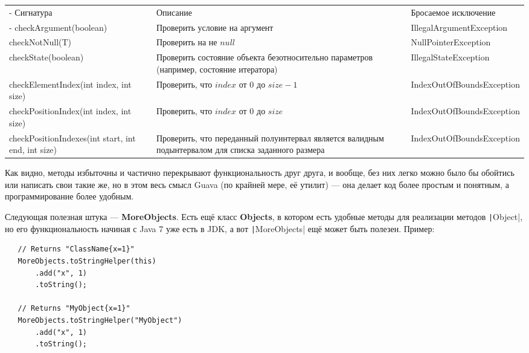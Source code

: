 \documentclass[a5paper,draft]{article}
\begin{document}
\begin{footnotesize}
\begin{tabu} {| X[0.9 l p] | X[1 l p] | X[1 l p] |}
	\tabucline-
	Сигнатура                                            & Описание                                                                                            & Бросаемое исключение      \\
	\tabucline-
	\everyrow{\tabucline-}
	checkArgument(boolean)                             & Проверить условие на аргумент                                                                       & IllegalArgumentException  \\
	checkNotNull(T)                                    & Проверить на не $null$                                                                              & NullPointerException      \\
	checkState(boolean)                                & Проверить состояние объекта безотносительно параметров (например, состояние итератора)              & IllegalStateException     \\
	checkElementIndex(int index, int size)             & Проверить, что $index$ от $0$ до $size - 1$                                                         & IndexOutOfBoundsException \\
	checkPositionIndex(int index, int size)            & Проверить, что $index$ от $0$ до $size$                                                             & IndexOutOfBoundsException \\
	checkPositionIndexes(int start, int end, int size) & Проверить, что переданный полуинтервал является валидным подынтервалом для списка заданного размера & IndexOutOfBoundsException \\
\end{tabu}
\end{footnotesize}

Как видно, методы избыточны и частично перекрывают функциональность друг друга, и вообще, без них легко можно было бы обойтись или написать свои такие же, но в этом весь смысл Guava (по крайней мере, её утилит) --- она делает код более простым и понятным, а программирование более удобным.

Следующая полезная штука --- \textbf{MoreObjects}. Есть ещё класс \textbf{Objects}, в котором есть удобные методы для реализации методов \texttt|Object|, но его функциональность начиная с Java 7 уже есть в JDK, а вот \texttt|MoreObjects| ещё может быть полезен. Пример:

\begin{verbatim}
   // Returns "ClassName{x=1}"
   MoreObjects.toStringHelper(this)
       .add("x", 1)
       .toString();

   // Returns "MyObject{x=1}"
   MoreObjects.toStringHelper("MyObject")
       .add("x", 1)
       .toString();
\end{verbatim}
\end{document}
